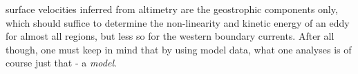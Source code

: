  surface velocities inferred from altimetry are the geostrophic
components only, which should suffice to \eg determine the non-linearity and kinetic energy of an eddy for almost all regions, but less so for \eg the western
boundary currents.
After all though, one must keep in mind that by using model data, what one analyses is of course just that - a \emph{model}.
